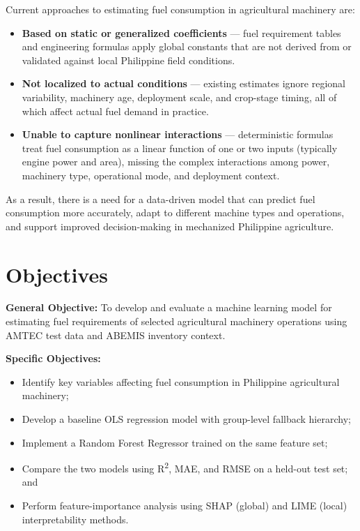 \documentclass[conference]{IEEEtran}
\begin{document}
Current approaches to estimating fuel consumption in agricultural machinery are:
\begin{itemize}
  \item \textbf{Based on static or generalized coefficients} --- fuel requirement tables and engineering formulas apply global constants that are not derived from or validated against local Philippine field conditions.
  \item \textbf{Not localized to actual conditions} --- existing estimates ignore regional variability, machinery age, deployment scale, and crop-stage timing, all of which affect actual fuel demand in practice.
  \item \textbf{Unable to capture nonlinear interactions} --- deterministic formulas treat fuel consumption as a linear function of one or two inputs (typically engine power and area), missing the complex interactions among power, machinery type, operational mode, and deployment context.
\end{itemize}

As a result, there is a need for a data-driven model that can predict fuel consumption more accurately, adapt to different machine types and operations, and support improved decision-making in mechanized Philippine agriculture.

\section{Objectives}

\textbf{General Objective:} To develop and evaluate a machine learning model for estimating fuel requirements of selected agricultural machinery operations using AMTEC test data and ABEMIS inventory context.

\textbf{Specific Objectives:}
\begin{itemize}
  \item Identify key variables affecting fuel consumption in Philippine agricultural machinery;
  \item Develop a baseline OLS regression model with group-level fallback hierarchy;
  \item Implement a Random Forest Regressor trained on the same feature set;
  \item Compare the two models using R\textsuperscript{2}, MAE, and RMSE on a held-out test set; and
  \item Perform feature-importance analysis using SHAP (global) and LIME (local) interpretability methods.
\end{itemize}
\end{document}
